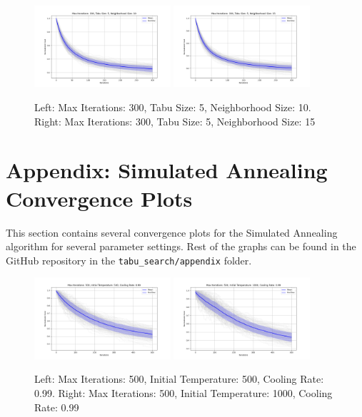 \documentclass{article}
\begin{document}
    \begin{figure}[H]
        \centering
        \includegraphics[width=0.45\textwidth]{tabu_search/appendix/max_iter_300_tabu_size_5_neighborhood_size_10.png}
        \includegraphics[width=0.45\textwidth]{tabu_search/appendix/max_iter_300_tabu_size_5_neighborhood_size_15.png}
        \caption{Left: Max Iterations: 300, Tabu Size: 5, Neighborhood Size: 10. Right: Max Iterations: 300, Tabu Size: 5, Neighborhood Size: 15}
        \label{fig:ts_300_5_10_300_5_15}
    \end{figure}


    \section{Appendix: Simulated Annealing Convergence Plots}
    This section contains several convergence plots for the Simulated Annealing algorithm for several parameter settings. Rest of the graphs can be found in the GitHub repository in the \texttt{tabu\_search/appendix} folder.
    \appendix


    \begin{figure}[H]
        \centering
        \includegraphics[width=0.45\textwidth]{simulated_annealing/appendix/max_iter_500_init_temp_500_cooling_rate_0.99.png}
        \includegraphics[width=0.45\textwidth]{simulated_annealing/appendix/max_iter_500_init_temp_1000_cooling_rate_0.99.png}
        \caption{Left: Max Iterations: 500, Initial Temperature: 500, Cooling Rate: 0.99. Right: Max Iterations: 500, Initial Temperature: 1000, Cooling Rate: 0.99}
        \label{fig:sa_500_500_0.99_500_1000_0.99}
    \end{figure}
\end{document}
